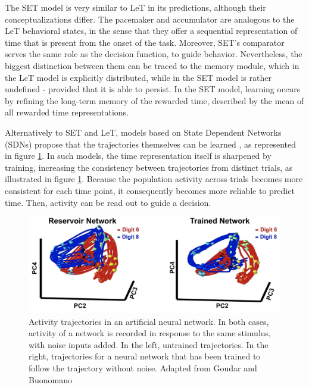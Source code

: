     The SET model is very similar to LeT in its predictions, although their conceptualizations differ. The pacemaker and accumulator are analogous to the LeT behavioral states, in the sense that they offer a sequential representation of time that is present from the onset of the task. Moreover, SET's comparator serves the same role as the decision function, to guide behavior. Nevertheless, the biggest distinction between them can be traced to the memory module, which in the LeT model is explicitly distributed, while in the SET model is rather undefined - provided that it is able to persist. In the SET model, learning occurs by refining the long-term memory of the rewarded time, described by the mean of all rewarded time representations. 
    
    Alternatively to SET and LeT, models based on State Dependent Networks (SDNs) propose that the trajectories themselves can be learned \cite{goudar2018encoding}, as represented in figure \ref{fig:sdn_trajectories_training}. In such models, the time representation itself is sharpened by training, increasing the consistency between trajectories from distinct trials, as illustrated in figure \ref{fig:sdn_trajectories_training}. Because the population activity across trials becomes more consistent for each time point, it consequently becomes more reliable to predict time. Then, activity can be read out to guide a decision.
    
    \begin{figure}
        \centering
        \includegraphics[width=.8\textwidth]{figures/sketches/sdn_trajectories_training.png}
        \caption[Activity trajectories in an artificial neural network]{Activity trajectories in an artificial neural network. In both cases, activity of a network is recorded in response to the same stimulus, with noise inputs added. In the left, untrained trajectories. In the right, trajectories for a neural network that has been trained to follow the trajectory without noise. Adapted from Goudar and Buonomano \cite{goudar2018encoding}}
        \label{fig:sdn_trajectories_training}
    \end{figure}

